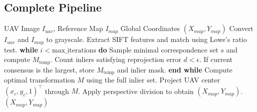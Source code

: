 \subsection{Complete Pipeline}\label{subsec:pipeline_complete}
\begin{algorithm}[H]
\caption{UAV Localization Pipeline}
\begin{algorithmic}[1]
\REQUIRE UAV Image $I_{uav}$, Reference Map $I_{map}$
\ENSURE Global Coordinates $(X_{map}, Y_{map})$
\STATE Convert $I_{uav}$ and $I_{map}$ to grayscale.
\STATE Extract SIFT features and match using Lowe's ratio test.
\STATE \textbf{while} $i < \text{max\_iterations}$ \textbf{do}
\STATE \quad Sample minimal correspondence set $s$ and compute $M_{\text{temp}}$.
\STATE \quad Count inliers satisfying reprojection error $d < \epsilon$.
\STATE \quad If current consensus is the largest, store $M_{\text{temp}}$ and inlier mask.
\STATE \textbf{end while}
\STATE Compute optimal transformation $M$ using the full inlier set.
\STATE Project UAV center $(x_c, y_c, 1)^\top$ through $M$.
\STATE Apply perspective division to obtain $(X_{map}, Y_{map})$.
\RETURN $(X_{map}, Y_{map})$
\end{algorithmic}
\end{algorithm}